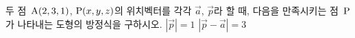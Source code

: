 두 점~$\mathrm{A}(2{,}\mkern3mu\mathopen{}3{,}\mkern3mu\mathopen{}1)$, $\mathrm{P}(x{,}\mkern3mu\mathopen{}y{,}\mkern3mu\mathopen{}z)$의 위치벡터를 각각 $\vec{a}$, $\vec{p}$라 할 때, 다음을 만족시키는 점~$\mathrm{P}$가 나타내는 도형의 방정식을 구하시오.
 $|\vec{p}|=1$
 $|\vec{p}-\vec{a}|=3$
